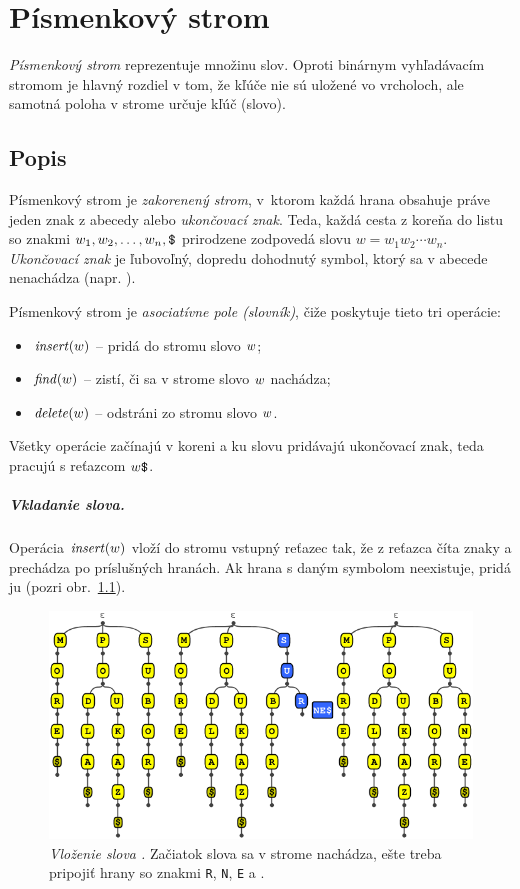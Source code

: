 
\chapter{Písmenkový strom}\label{chap:trie}

\emph{Písmenkový strom} reprezentuje množinu slov. Oproti binárnym 
vyhľadávacím stromom je hlavný rozdiel v tom, že kľúče nie sú uložené 
vo vrcholoch, ale samotná poloha v strome určuje kľúč (slovo). 

\section{Popis}\label{sec:trie:popis}
Písmenkový strom je \emph{zakorenený strom}, v~ktorom každá hrana obsahuje 
práve jeden znak z abecedy alebo \emph{ukončovací znak}. Teda, každá cesta 
z koreňa do listu so znakmi $w_1, w_2, \ldots, w_n, \hbox{\tt\$}$ prirodzene 
zodpovedá slovu $w=w_1w_2\cdots w_n$. \emph{Ukončovací znak} je ľubovoľný, 
dopredu dohodnutý symbol, ktorý sa v abecede nenachádza (napr. \uz). 

Písmenkový strom je \emph{asociatívne pole (slovník)}, čiže 
poskytuje tieto tri operácie:
\begin{itemize}
\item $\mathop{\mathit{insert}}(w)$ -- pridá do stromu slovo $w$;
\item $\mathop{\mathit{find}}(w)$ -- zistí, či sa v strome slovo $w$ nachádza;
\item $\mathop{\mathit{delete}}(w)$ -- odstráni zo stromu slovo $w$.
\end{itemize}
Všetky operácie začínajú v koreni a ku slovu pridávajú ukončovací znak, 
teda pracujú s reťazcom $w\hbox{\tt\$}$. 

\paragraph{Vkladanie slova.}%
Operácia $\mathop{\mathit{insert}}(w)$ vloží do stromu vstupný reťazec tak, že z reťazca číta znaky 
a prechádza po príslušných hranách. Ak hrana s daným symbolom neexistuje, 
pridá ju (pozri obr.~\ref{img:trieinsert}).

\begin{figure}
\centering
\includegraphics[width=0.9\columnwidth]{obrazky/trieinsertsmall.png}
\caption{\emph{Vloženie slova .} Začiatok slova 
 sa v strome nachádza, ešte treba pripojiť hrany 
so znakmi {\tt R}, {\tt N}, {\tt E} a \uz.} 
\label{img:trieinsert} 
\end{figure}

